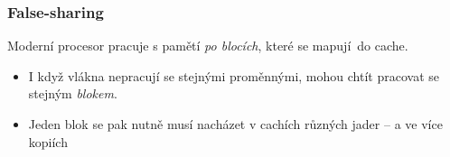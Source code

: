 \documentclass[usenames,dvipsnames,9pt]{beamer}
\begin{document}
\begin{frame}[t]
  \frametitle{False-sharing}
  Moderní procesor pracuje s pamětí \emph{po blocích}, které se mapují do cache.
  \begin{itemize}
    \item I když vlákna nepracují se stejnými proměnnými, mohou chtít pracovat se stejným \emph{blokem}.
    \item Jeden blok se pak nutně musí nacházet v cachích různých jader -- a ve více kopiích
  \end{itemize}
  \vspace{1em}
  \begin{figure}
    \centering

\end{figure}
\end{frame}
\end{document}
